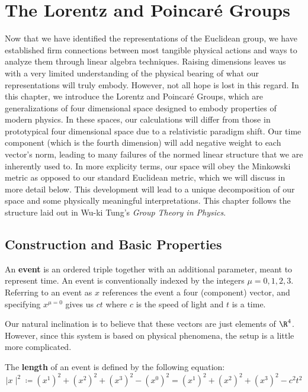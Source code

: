 \chapter{The Lorentz and Poincar\'e Groups}\label{lorentz}

Now that we have identified the representations of the Euclidean group, we have established firm connections between most tangible physical actions and ways to analyze them through linear algebra techniques. Raising dimensions leaves us with a very limited understanding of the physical bearing of what our representations will truly embody. However, not all hope is lost in this regard. In this chapter, we introduce the Lorentz and Poincar\'e Groups, which are generalizations of four dimensional space designed to embody properties of modern physics. In these spaces, our calculations will differ from those in prototypical four dimensional space due to a relativistic paradigm shift. Our time component (which is the fourth dimension) will add negative weight to each vector's norm, leading to many failures of the normed linear structure that we are inherently used to. In more explicity terms, our space will obey the Minkowski metric as opposed to our standard Euclidean metric, which we will discuss in more detail below. This development will lead to a unique decomposition of our space and some physically meaningful interpretations. This chapter follows the structure laid out in Wu-ki Tung's \textit{Group Theory in Physics}. \cite{Tung}


\section{Construction and Basic Properties}

\begin{definition}
	An \textbf{event} is an ordered triple together with an additional parameter, meant to represent time. An event is conventionally indexed by the integers $\mu = 0,1,2,3$. Referring to an event as $x$ references the event a four (component) vector, and specifying $x^{\mu=0}$ gives us $ct$ where $c$ is the speed of light and $t$ is a time. 
\end{definition}

Our natural inclination is to believe that these vectors are just elements of $\R^4$. However, since this system is based on physical phenomena, the setup is a little more complicated.

\begin{definition}
	The \textbf{length} of an event is defined by the following equation:
$$\mid x\mid^2 \coloneq (x^1)^2+(x^2)^2+(x^3)^2 - (x^0)^2 = (x^1)^2+(x^2)^2+(x^3)^2 - c^2t^2$$
\end{definition}

